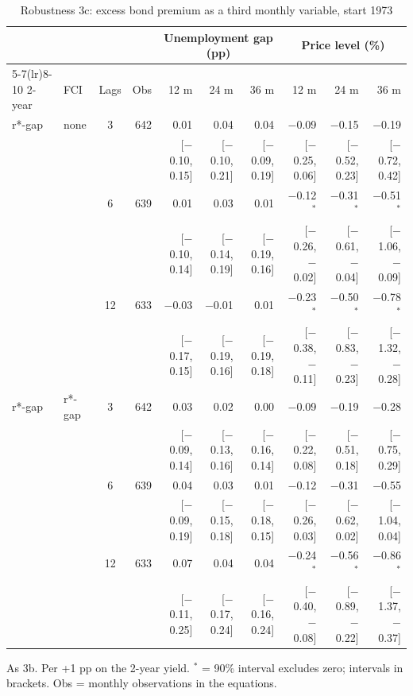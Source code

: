 \begin{table}[p]\centering\footnotesize\setlength{\tabcolsep}{2.2pt}
\caption{Robustness 3c: excess bond premium as a third monthly variable, start 1973}\label{tab:R3c}
\begin{tabular}{llcrrrrrrr}\toprule
 & & & & \multicolumn{3}{c}{Unemployment gap (pp)} & \multicolumn{3}{c}{Price level (\%)}\\ \cmidrule(lr){5-7}\cmidrule(lr){8-10}
2-year & FCI & Lags & Obs & 12 m & 24 m & 36 m & 12 m & 24 m & 36 m\\ \midrule
r*-gap & none & 3 & 642 & 0.01 & 0.04 & 0.04 & $-$0.09 & $-$0.15 & $-$0.19\\
 & & & & {\scriptsize [$-$0.10, 0.15]} & {\scriptsize [$-$0.10, 0.21]} & {\scriptsize [$-$0.09, 0.19]} & {\scriptsize [$-$0.25, 0.06]} & {\scriptsize [$-$0.52, 0.23]} & {\scriptsize [$-$0.72, 0.42]}\\
 &  & 6 & 639 & 0.01 & 0.03 & 0.01 & $-$0.12$^{*}$ & $-$0.31$^{*}$ & $-$0.51$^{*}$\\
 & & & & {\scriptsize [$-$0.10, 0.14]} & {\scriptsize [$-$0.14, 0.19]} & {\scriptsize [$-$0.19, 0.16]} & {\scriptsize [$-$0.26, $-$0.02]} & {\scriptsize [$-$0.61, $-$0.04]} & {\scriptsize [$-$1.06, $-$0.09]}\\
 &  & 12 & 633 & $-$0.03 & $-$0.01 & 0.01 & $-$0.23$^{*}$ & $-$0.50$^{*}$ & $-$0.78$^{*}$\\
 & & & & {\scriptsize [$-$0.17, 0.15]} & {\scriptsize [$-$0.19, 0.16]} & {\scriptsize [$-$0.19, 0.18]} & {\scriptsize [$-$0.38, $-$0.11]} & {\scriptsize [$-$0.83, $-$0.23]} & {\scriptsize [$-$1.32, $-$0.28]}\\
r*-gap & r*-gap & 3 & 642 & 0.03 & 0.02 & 0.00 & $-$0.09 & $-$0.19 & $-$0.28\\
 & & & & {\scriptsize [$-$0.09, 0.14]} & {\scriptsize [$-$0.13, 0.16]} & {\scriptsize [$-$0.16, 0.14]} & {\scriptsize [$-$0.22, 0.08]} & {\scriptsize [$-$0.51, 0.18]} & {\scriptsize [$-$0.75, 0.29]}\\
 &  & 6 & 639 & 0.04 & 0.03 & 0.01 & $-$0.12 & $-$0.31 & $-$0.55\\
 & & & & {\scriptsize [$-$0.09, 0.19]} & {\scriptsize [$-$0.15, 0.18]} & {\scriptsize [$-$0.18, 0.15]} & {\scriptsize [$-$0.26, 0.03]} & {\scriptsize [$-$0.62, 0.02]} & {\scriptsize [$-$1.04, 0.04]}\\
 &  & 12 & 633 & 0.07 & 0.04 & 0.04 & $-$0.24$^{*}$ & $-$0.56$^{*}$ & $-$0.86$^{*}$\\
 & & & & {\scriptsize [$-$0.11, 0.25]} & {\scriptsize [$-$0.17, 0.24]} & {\scriptsize [$-$0.16, 0.24]} & {\scriptsize [$-$0.40, $-$0.08]} & {\scriptsize [$-$0.89, $-$0.22]} & {\scriptsize [$-$1.37, $-$0.37]}\\
\bottomrule\end{tabular}
\par\smallskip\parbox{0.96\linewidth}{\scriptsize As 3b. Per +1 pp on the 2-year yield. $^{*}$ = 90\% interval excludes zero; intervals in brackets. Obs = monthly observations in the equations.}
\end{table}
